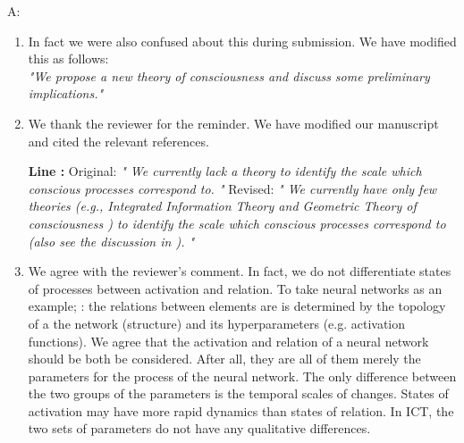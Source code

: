 \documentclass[utf8]{article}
\newenvironment{ans}  
    {\color{Black}\noindent A:}
    {~\newline}
\newcommand{\revise}[3]{
	\newline
	\newline
    \noindent
    \textbf{Line #1:}
    \newline
    Original:\newline
    \textit{"#2"}
    \newline
    \newline
    Revised:\newline
    \textit{"#3"}\newline}
\begin{document}
    	\begin{ans}
    		\begin{enumerate}
    			\item In fact we were also confused about this during submission. 
    			We have modified this as follows: \\
    			\textit{"We propose a new theory of consciousness and discuss some preliminary implications."}

    			
    			\item We thank the reviewer for the reminder. We have modified our manuscript and cited the relevant references. 
    			\revise{}
    			{
    			We currently lack a theory to identify the scale which conscious processes correspond to.
    			}
    			{
    			We currently have only few theories (e.g., Integrated Information Theory \citep{hoel2016can} and Geometric Theory of consciousness \citep{fekete2011towards,fekete2012lack}) to identify the scale which conscious processes correspond to (also see the discussion in \cite{fekete2016system}).
    			}    			
    			
    			\item We agree with the reviewer’s comment. In fact, we do not differentiate states of processes between activation and relation. To take neural networks as an example; : the relations between elements are is determined by the topology of a the network (structure) and its hyperparameters (e.g. activation functions). We agree that the activation and relation of a neural network should be both be considered. After all, they are all of them merely the parameters for the process of the neural network. The only difference between the two groups of the parameters is the temporal scales of changes. States of activation may have more rapid dynamics than states of relation. In ICT, the two sets of parameters do not have any qualitative differences.
    			
    		\end{enumerate}
    		
    	\end{ans}
        
        
\end{document}
